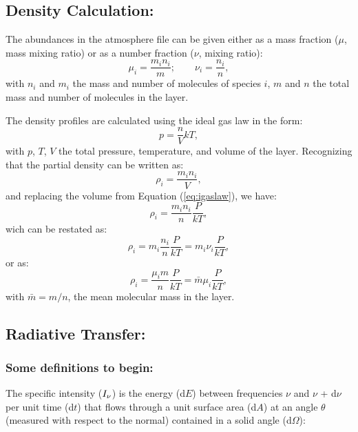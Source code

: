 \documentclass[letterpaper,12pt]{article}
\begin{document}
{\subsection{Density Calculation:}

The abundances in the atmosphere file can be given either as a mass
fraction ($\mu$, mass mixing ratio) or as a number fraction ($\nu$,
mixing ratio):
\begin{equation}
\mu_i = \frac{m_in_i}{m}; \qquad \nu_i = \frac{n_i}{n},
\end{equation}
with $n_i$ and $m_i$ the mass and number of molecules of species $i$,
$m$ and $n$ the total mass and number of molecules in the layer.

The density profiles are calculated using the ideal gas law in the form:
\begin{equation}
p = \frac{n}{V}kT,
\label{eq:igaslaw}
\end{equation}
with $p$, $T$, $V$ the total pressure, temperature, and volume of the
layer.  Recognizing that the partial density can be written as:
\begin{equation}
\rho_i = \frac{m_in_i}{V},
\end{equation}
and replacing the volume from Equation (\ref{eq:igaslaw}), we have:
\begin{equation}
  \rho_i = \frac{m_in_i}{n}\frac{P}{kT},
\end{equation}
wich can be restated as:
\begin{equation}
  \rho_i = m_i\frac{n_i}{n}\frac{P}{kT} = m_i\nu_i\frac{P}{kT},
\end{equation}
or as:
\begin{equation}
  \rho_i = \frac{\mu_im}{n}\frac{P}{kT} = \bar{m}\mu_i\frac{P}{kT},
\end{equation}
with $\bar{m} = m/n$, the mean molecular mass in the layer.


\subsection{Radiative Transfer:}

\subsubsection{Some definitions to begin:}
The specific intensity ($I\sb{\nu}$) is the
energy (d$E$) between frequencies $\nu$ and $\nu$ + d$\nu$ per unit
time (d$t$) that flows through a unit surface area (d$A$) at an angle
$\theta$ (measured with respect to the normal) contained in a solid
angle (d$\Omega$):

}
\end{document}
